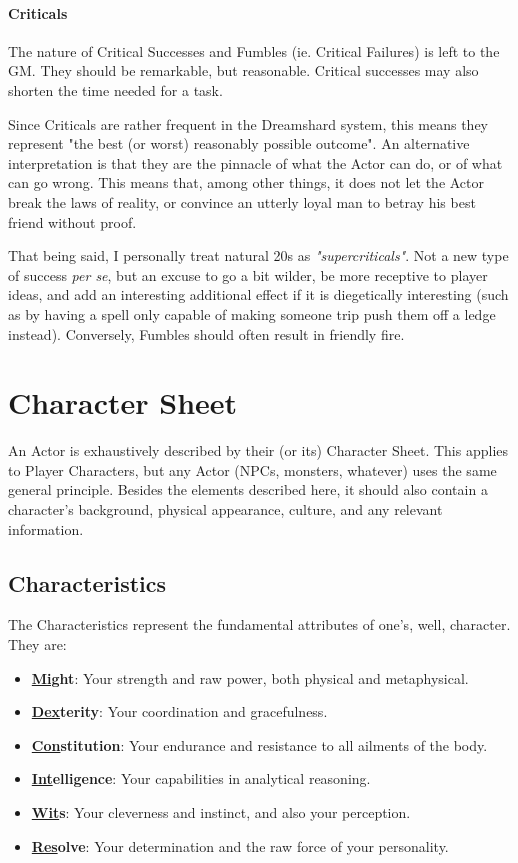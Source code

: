 \paragraph{Criticals} 

The nature of Critical Successes and Fumbles (ie. Critical Failures) is left to the GM. They should be remarkable, but reasonable. Critical successes may also shorten the time needed for a task.

Since Criticals are rather frequent in the Dreamshard system, this means they represent "the best (or worst) reasonably possible outcome". An alternative interpretation is that they are the pinnacle of what the Actor can do, or of what can go wrong. This means that, among other things, it does not let the Actor break the laws of reality, or convince an utterly loyal man to betray his best friend without proof.

That being said, I personally treat natural 20s as \textit{"supercriticals"}. Not a new type of success \textit{per se}, but an excuse to go a bit wilder, be more receptive to player ideas, and add an interesting additional effect if it is diegetically interesting (such as by having a spell only capable of making someone trip push them off a ledge instead). Conversely, Fumbles should often result in friendly fire.

\section{Character Sheet}

An Actor is exhaustively described by their (or its) Character Sheet. This applies to Player Characters, but any Actor (NPCs, monsters, whatever) uses the same general principle. Besides the elements described here, it should also contain a character's background, physical appearance, culture, and any relevant information.

\subsection{Characteristics}
\label{characteristics}



The Characteristics represent the fundamental attributes of one's, well, character. They are:

\begin{itemize}
	\item \textbf{\underline{Mig}ht}: Your strength and raw power, both physical and metaphysical.
	\item \textbf{\underline{Dex}terity}: Your coordination and gracefulness.
	\item \textbf{\underline{Con}stitution}: Your endurance and resistance to all ailments of the body.
	\item \textbf{\underline{Int}elligence}: Your capabilities in analytical reasoning.
	\item \textbf{\underline{Wit}s}: Your cleverness and instinct, and also your perception.
	\item \textbf{\underline{Res}olve}: Your determination and the raw force of your personality.
\end{itemize}

